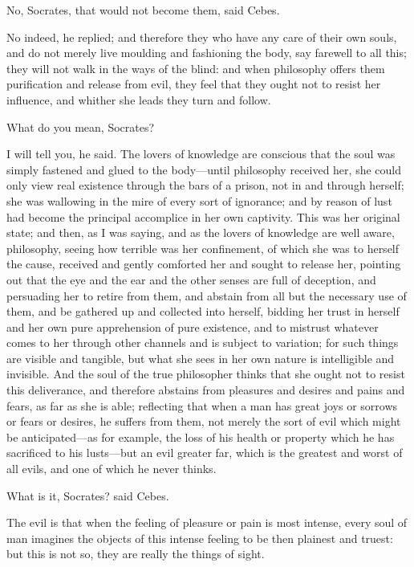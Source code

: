 \documentclass[11pt,letter]{article}
\begin{document}
\par  No, Socrates, that would not become them, said Cebes.

\par  No indeed, he replied; and therefore they who have any care of their own souls, and do not merely live moulding and fashioning the body, say farewell to all this; they will not walk in the ways of the blind: and when philosophy offers them purification and release from evil, they feel that they ought not to resist her influence, and whither she leads they turn and follow.

\par  What do you mean, Socrates?

\par  I will tell you, he said. The lovers of knowledge are conscious that the soul was simply fastened and glued to the body—until philosophy received her, she could only view real existence through the bars of a prison, not in and through herself; she was wallowing in the mire of every sort of ignorance; and by reason of lust had become the principal accomplice in her own captivity. This was her original state; and then, as I was saying, and as the lovers of knowledge are well aware, philosophy, seeing how terrible was her confinement, of which she was to herself the cause, received and gently comforted her and sought to release her, pointing out that the eye and the ear and the other senses are full of deception, and persuading her to retire from them, and abstain from all but the necessary use of them, and be gathered up and collected into herself, bidding her trust in herself and her own pure apprehension of pure existence, and to mistrust whatever comes to her through other channels and is subject to variation; for such things are visible and tangible, but what she sees in her own nature is intelligible and invisible. And the soul of the true philosopher thinks that she ought not to resist this deliverance, and therefore abstains from pleasures and desires and pains and fears, as far as she is able; reflecting that when a man has great joys or sorrows or fears or desires, he suffers from them, not merely the sort of evil which might be anticipated—as for example, the loss of his health or property which he has sacrificed to his lusts—but an evil greater far, which is the greatest and worst of all evils, and one of which he never thinks.

\par  What is it, Socrates? said Cebes.

\par  The evil is that when the feeling of pleasure or pain is most intense, every soul of man imagines the objects of this intense feeling to be then plainest and truest: but this is not so, they are really the things of sight.
\end{document}
